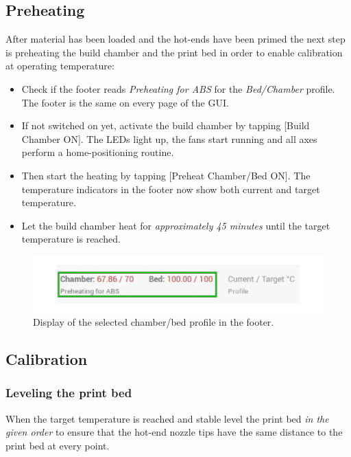 \subsection{Preheating}

After material has been loaded and the hot-ends have been primed the next step is preheating the build chamber and the print bed in order to enable calibration at operating temperature: 


\begin{itemize}
  \item Check if the footer reads \emph{Preheating for ABS} for the \emph{Bed/Chamber} 
        profile. The footer is the same on every page of the GUI.
  \item If not switched on yet, activate the build chamber by tapping [Build Chamber ON]. The LEDs light up, the 
        fans start running and all axes perform a home-positioning routine.
  \item Then start the heating by tapping [Preheat Chamber/Bed ON]. The temperature 
        indicators in the footer now show both current and target temperature.
  \item Let the build chamber heat for \emph{approximately 45 minutes} until the target 
        temperature is reached.
\end{itemize}


\begin{figure}[H]
  \centering
  \includegraphics[width=.7\linewidth]{./img/gui_footercut_v110.png}
  \caption{Display of the selected chamber/bed profile in the footer.}
\end{figure}


\subsection{Calibration}

\subsubsection{Leveling the print bed}

When the target temperature is reached and stable level the print bed \emph{in the given order} to ensure that the hot-end nozzle tips have the same distance to the print bed at every point.

